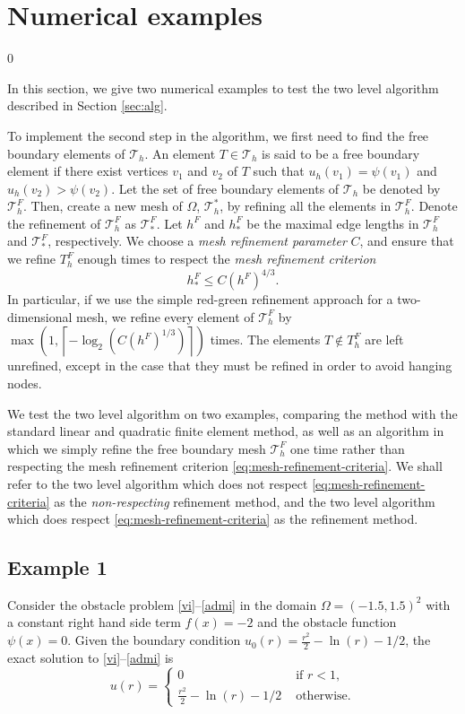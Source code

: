 \documentclass[12pt]{article}
\begin{document}
\section{Numerical examples}\label{sec:num}
\setcounter{equation}0

In this section, we give two numerical examples to test the two level algorithm described in Section \ref{sec:alg}.

To implement the second step in the algorithm, we first need
to find the free boundary elements of $\mathcal{T}_h$.  An element $T\in
  \mathcal{T}_h$ is said to be a free boundary element if there exist vertices
  $v_1$ and $v_2$ of $T$ such that $u_h(v_1)=\psi(v_1)$ and
  $u_h(v_2)>\psi(v_2)$. Let the set of free boundary elements of
  $\mathcal{T}_h$ be denoted by $\mathcal{T}_h^F$. 
Then, create a new mesh of $\Omega$, $\mathcal{T}_h^*$, by refining all the
  elements in $\mathcal{T}_h^F$.  Denote the refinement of $\mathcal{T}_h^F$ as $\mathcal{T}_*^F$.
Let $h^F$ and $h_*^F$ be the maximal edge lengths in $\mathcal{T}_h^F$ and $\mathcal{T}_*^F$, respectively.   
We choose a \textit{mesh refinement parameter} $C$, and  ensure that we refine $T_h^F$ enough times to respect
the \textit{mesh refinement criterion}
  \begin{equation}
    \label{eq:mesh-refinement-criteria}
    h_*^F\le C \left(h^F\right)^{4/3}.
  \end{equation}
In particular, if we use the simple red-green refinement approach for
a two-dimensional mesh, we refine every element of $\mathcal{T}_h^F$ by $\max\left(1,\left\lceil
-\log_2\left(C \left(h^F\right)^{1/3}\right)\right\rceil\right)$ times. 
The elements $T \notin T_h^F$ are left unrefined, except in the case that they must be refined 
in order to avoid hanging nodes.   

We test the two level algorithm on two examples,
comparing the method with the standard linear and quadratic finite
element method, as well as an algorithm in which we simply
refine the free boundary mesh $\mathcal{T}_h^F$ one time rather than respecting
the mesh refinement criterion \eqref{eq:mesh-refinement-criteria}.  We
shall refer to the two level algorithm which does not respect
\eqref{eq:mesh-refinement-criteria} as the \textit{non-respecting}
refinement method, and the two level algorithm which does respect
\eqref{eq:mesh-refinement-criteria} as the refinement method. 

\subsection{Example 1}
Consider the obstacle problem \eqref{vi}--\eqref{admi} in the domain $\Omega=(-1.5,1.5)^2$ with 
a constant right hand side term $f(x)= -2$ and the obstacle function $\psi(x)=0$. Given the boundary
condition $u_0(r)=\frac{r^2}{2}-\ln(r)-1/2$, the exact solution to \eqref{vi}--\eqref{admi} is
\begin{equation*}
u(r)=  \begin{cases}
  0 &\text{ if } r<1,\\
  \frac{r^2}{2}-\ln(r)-1/2 & \text{ otherwise.}
\end{cases}
\end{equation*}
\end{document}
